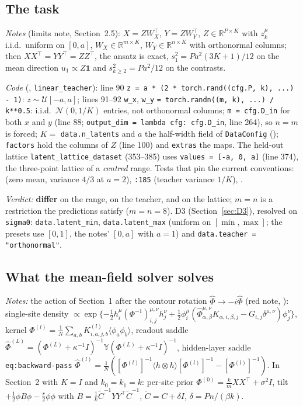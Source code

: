 \documentclass[11pt,a4paper]{article}
\newcommand{\R}{\mathbb R}
\newcommand{\code}[1]{\texttt{#1}}
\newcommand{\differ}{\textbf{differ}}
\begin{document}
\subsection{The task}
\label{sec:task}
\emph{Notes} (limits note, Section~2.5): $X = ZW_X^\top$, $Y = ZW_Y^\top$, $Z\in\R^{P\times K}$ with $z^\mu_k$ i.i.d.\ uniform on $[0,a]$, $W_X\in\R^{m\times K}$, $W_Y\in\R^{n\times K}$ with orthonormal columns; then $XX^\top = YY^\top = ZZ^\top$, the ansatz is exact, $s_1^2 = Pa^2(3K+1)/12$ on the mean direction $u_1\propto Z\mathbf 1$ and $s_{k\ge2}^2 = Pa^2/12$ on the contrasts.

\emph{Code} (, \code{linear\_teacher}): line 90 \code{z = a * (2 * torch.rand((cfg.P, k), ...) - 1)}: $z\sim\mathcal U[-a, a]$; lines 91--92 \code{w\_x}, \code{w\_y} \code{= torch.randn((m, k), ...) / k**0.5}: i.i.d.\ $\mathcal N(0, 1/K)$ entries, not orthonormal columns; \code{m = cfg.D\_in} for both $x$ and $y$ (line 88; \code{output\_dim = lambda cfg: cfg.D\_in}, line 264), so $n = m$ is forced; $K = $ \code{data.n\_latents} and $a$ the half-width field of \code{DataConfig} (); \code{factors} hold the columns of $Z$ (line 100) and \code{extras} the maps. The held-out lattice \code{latent\_lattice\_dataset} (353--385) uses \code{values = [-a, 0, a]} (line 374), the three-point lattice of a \emph{centred} range. Tests that pin the current conventions:  (zero mean, variance $4/3$ at $a = 2$), \code{:185} (teacher variance $1/K$), .

\emph{Verdict:} \differ{} on the range, on the teacher, and on the lattice; $m = n$ is a restriction the predictions satisfy ($m = n = 8$). D3 (Section~\ref{sec:D3}), resolved on \code{sigma0}: \code{data.latent\_min}, \code{data.latent\_max} (uniform on $[\min, \max]$; the presets use $[0, 1]$, the notes' $[0, a]$ with $a = 1$) and \code{data.teacher = "orthonormal"}.

\subsection{What the mean-field solver solves}
\label{sec:solver}
\emph{Notes:} the action of Section~1 after the contour rotation $\hat\Phi\to-i\hat\Phi$ (red note, ): single-site density $\propto\exp\{-\frac12h^\mu_i(\Phi^{-1})^{\mu,\nu}_{i,j}h^\nu_j + \frac12\phi^\mu_i(\hat\Phi^{\mu,\nu}_{\alpha,\beta}K_{\alpha,i,\beta,j} - G_{i,j}\delta^{\mu,\nu})\phi^\nu_j\}$, kernel $\Phi^{(l)} = \frac1N\sum_{a,b}K^{(l)}_{i,a,j,b}\langle\phi_a\phi_b\rangle$, readout saddle $\hat\Phi^{(L)} = (\Phi^{(L)} + \kappa^{-1}I)^{-1}\mathbb Y(\Phi^{(L)} + \kappa^{-1}I)^{-1}$, hidden-layer saddle \code{eq:backward-pass} $\hat\Phi^{(l)} = \frac1N([\Phi^{(l)}]^{-1}\langle h\otimes h\rangle[\Phi^{(l)}]^{-1} - [\Phi^{(l)}]^{-1})$. In Section~2 with $K = I$ and $k_0 = k_1 = k$: per-site prior $\Phi^{(0)} = \frac km XX^\top + \sigma^2I$, tilt $+\frac12\phi B\phi - \frac{r}2\phi\phi$ with $B = \frac1k\tilde C^{-1}YY^\top\tilde C^{-1}$, $\tilde C = C + \delta I$, $\delta = Pn/(\beta k)$.
\end{document}
